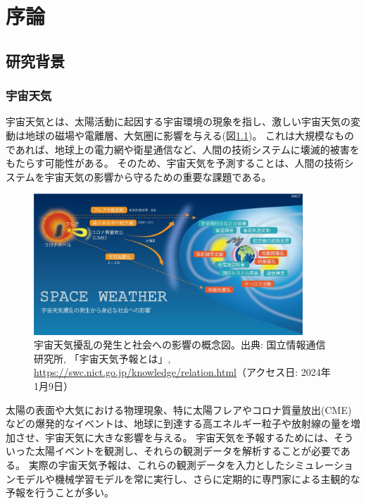 \chapter{序論}

\section{研究背景}
  \subsection{宇宙天気}
  宇宙天気とは、太陽活動に起因する宇宙環境の現象を指し、激しい宇宙天気の変動は地球の磁場や電離層、大気圏に影響を与える(図\ref{fig:space_weather_impact})。
  これは大規模なものであれば、地球上の電力網や衛星通信など、人間の技術システムに壊滅的被害をもたらす可能性がある。
  そのため、宇宙天気を予測することは、人間の技術システムを宇宙天気の影響から守るための重要な課題である。
  \begin{figure}[htbp]
    \centering
    \includegraphics[width=0.9\textwidth]{figures/spaceweather.jpg}
    \caption[宇宙天気擾乱と社会への影響]{宇宙天気擾乱の発生と社会への影響の概念図。出典: 国立情報通信研究所, 「宇宙天気予報とは」, \url{https://swc.nict.go.jp/knowledge/relation.html}（アクセス日: 2024年1月9日）}
    \label{fig:space_weather_impact}
  \end{figure}

  太陽の表面や大気における物理現象、特に太陽フレアやコロナ質量放出(CME)などの爆発的なイベントは、地球に到達する高エネルギー粒子や放射線の量を増加させ、宇宙天気に大きな影響を与える。
  宇宙天気を予報するためには、そういった太陽イベントを観測し、それらの観測データを解析することが必要である。
  実際の宇宙天気予報は、これらの観測データを入力としたシミュレーションモデルや機械学習モデルを常に実行し、さらに定期的に専門家による主観的な予報を行うことが多い。

